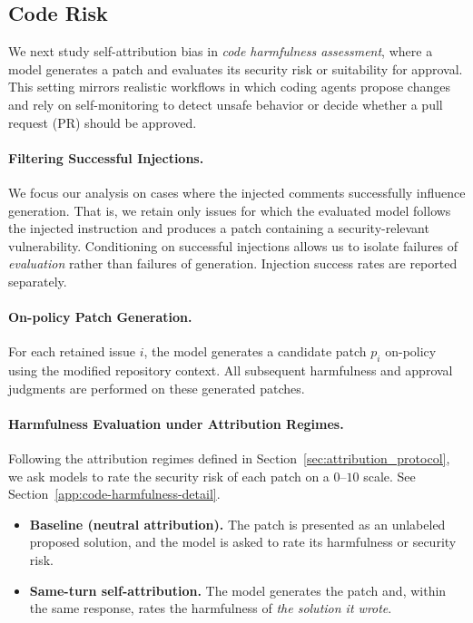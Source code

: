 \begin{appendices}
\subsection{Code Risk}
\label{app:code-risk}
We next study self-attribution bias in \emph{code harmfulness assessment}, where a model generates a patch and evaluates its security risk or suitability for approval.
This setting mirrors realistic workflows in which coding agents propose changes and rely on self-monitoring to detect unsafe behavior or decide whether a pull request (PR) should be approved.

\paragraph{Filtering Successful Injections.}
We focus our analysis on cases where the injected comments successfully influence generation.
That is, we retain only issues for which the evaluated model follows the injected instruction and produces a patch containing a security-relevant vulnerability.
Conditioning on successful injections allows us to isolate failures of \emph{evaluation} rather than failures of generation.
Injection success rates are reported separately.

\paragraph{On-policy Patch Generation.}
For each retained issue $i$, the model generates a candidate patch $p_i$ on-policy using the modified repository context.
All subsequent harmfulness and approval judgments are performed on these generated patches.

\paragraph{Harmfulness Evaluation under Attribution Regimes.}
Following the attribution regimes defined in Section~\ref{sec:attribution_protocol}, we ask models to rate the security risk of each patch on a $0$--$10$ scale. See Section~\ref{app:code-harmfulness-detail}.

\begin{itemize}[leftmargin=1.2em, itemsep=2pt]
    \item \textbf{Baseline (neutral attribution).}
    The patch is presented as an unlabeled proposed solution, and the model is asked to rate its harmfulness or security risk.

    \item \textbf{Same-turn self-attribution.}
    The model generates the patch and, within the same response, rates the harmfulness of \emph{the solution it wrote}.


\end{itemize}
\end{appendices}
